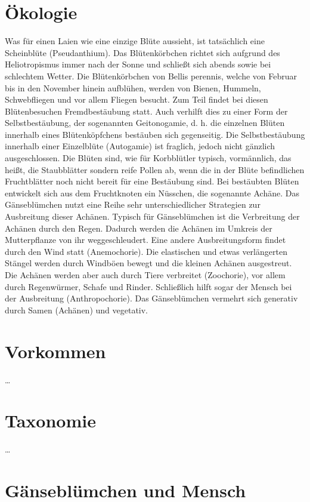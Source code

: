 \documentclass[11pt]{article}
\begin{document}
	\section{Ökologie}
	Was für einen Laien wie eine einzige Blüte aussieht, ist tatsächlich eine Scheinblüte (Pseudanthium). Das Blütenkörbchen richtet sich aufgrund des Heliotropismus immer nach der Sonne und schließt sich abends sowie bei schlechtem Wetter. Die Blütenkörbchen von Bellis perennis, welche von Februar bis in den November hinein aufblühen, werden von Bienen, Hummeln, Schwebfliegen und vor allem Fliegen besucht. Zum Teil findet bei diesen Blütenbesuchen Fremdbestäubung statt. Auch verhilft dies zu einer Form der Selbstbestäubung, der sogenannten Geitonogamie, d. h. die einzelnen Blüten innerhalb eines Blütenköpfchens bestäuben sich gegenseitig. Die Selbstbestäubung innerhalb einer Einzelblüte (Autogamie) ist fraglich, jedoch nicht gänzlich ausgeschlossen. Die Blüten sind, wie für Korbblütler typisch, vormännlich, das heißt, die Staubblätter sondern reife Pollen ab, wenn die in der Blüte befindlichen Fruchtblätter noch nicht bereit für eine Bestäubung sind. Bei bestäubten Blüten entwickelt sich aus dem Fruchtknoten ein Nüsschen, die sogenannte Achäne. Das Gänseblümchen nutzt eine Reihe sehr unterschiedlicher Strategien zur Ausbreitung dieser Achänen.
    Typisch für Gänseblümchen ist die Verbreitung der Achänen durch den Regen. Dadurch werden die Achänen im Umkreis der Mutterpflanze von ihr weggeschleudert. Eine andere Ausbreitungsform findet durch den Wind statt (Anemochorie). Die elastischen und etwas verlängerten Stängel werden durch Windböen bewegt und die kleinen Achänen ausgestreut. Die Achänen werden aber auch durch Tiere verbreitet (Zoochorie), vor allem durch Regenwürmer, Schafe und Rinder. Schließlich hilft sogar der Mensch bei der Ausbreitung (Anthropochorie). Das Gänseblümchen vermehrt sich generativ durch Samen (Achänen) und vegetativ.
    
    \section{Vorkommen}
    \dots 
    
    \section{Taxonomie}
    \dots
    
    \section{Gänseblümchen und Mensch}
\end{document}

